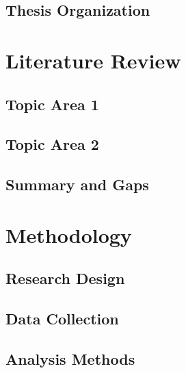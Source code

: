\documentclass[12pt]{report}
\begin{document}
\section{Thesis Organization}
\label{sec:organization}


\chapter{Literature Review}
\label{ch:literature}

\section{Topic Area 1}
\label{sec:topic1}


\section{Topic Area 2}
\label{sec:topic2}


\section{Summary and Gaps}
\label{sec:gaps}


\chapter{Methodology}
\label{ch:methodology}

\section{Research Design}
\label{sec:design}


\section{Data Collection}
\label{sec:collection}


\section{Analysis Methods}
\label{sec:analysis}
\end{document}
